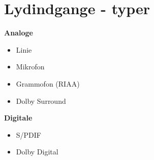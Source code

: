 \chapter{Lydindgange - typer}
\label{indgange}
\textbf{Analoge}
\begin{itemize}
\item{Linie}
\item{Mikrofon}
\item{Grammofon (RIAA)}
\item{Dolby Surround}
\end{itemize}

\textbf{Digitale}
\begin{itemize}
\item{S/PDIF}
\item{Dolby Digital}
\end{itemize}